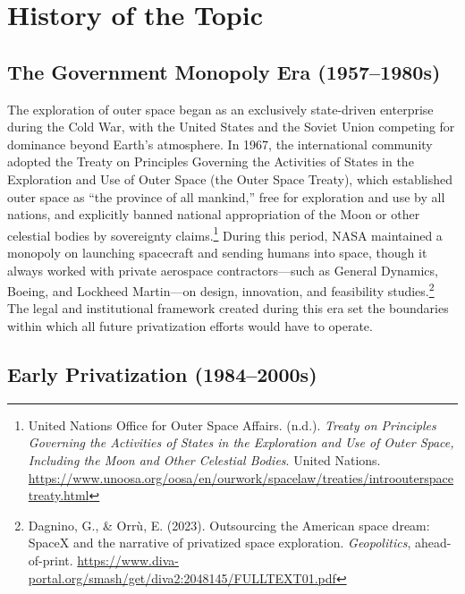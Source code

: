 \section{History of the Topic}

\subsection{The Government Monopoly Era (1957–1980s)}

The exploration of outer space began as an exclusively state-driven enterprise during the Cold War, with the United States and the Soviet Union competing for dominance beyond Earth’s atmosphere. In 1967, the international community adopted the Treaty on Principles Governing the Activities of States in the Exploration and Use of Outer Space (the Outer Space Treaty), which established outer space as “the province of all mankind,” free for exploration and use by all nations, and explicitly banned national appropriation of the Moon or other celestial bodies by sovereignty claims.\footnote{United Nations Office for Outer Space Affairs. (n.d.). \emph{Treaty on Principles Governing the Activities of States in the Exploration and Use of Outer Space, Including the Moon and Other Celestial Bodies}. United Nations. \url{https://www.unoosa.org/oosa/en/ourwork/spacelaw/treaties/introouterspacetreaty.html}} During this period, NASA maintained a monopoly on launching spacecraft and sending humans into space, though it always worked with private aerospace contractors—such as General Dynamics, Boeing, and Lockheed Martin—on design, innovation, and feasibility studies.\footnote{Dagnino, G., \& Orrù, E. (2023). Outsourcing the American space dream: SpaceX and the narrative of privatized space exploration. \emph{Geopolitics}, ahead-of-print. \url{https://www.diva-portal.org/smash/get/diva2:2048145/FULLTEXT01.pdf}} The legal and institutional framework created during this era set the boundaries within which all future privatization efforts would have to operate.

\subsection{Early Privatization (1984–2000s)}

